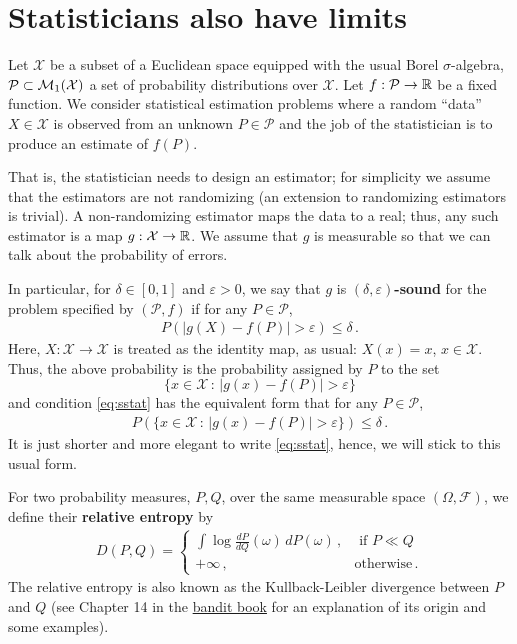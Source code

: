 \documentclass{article}
\newcommand{\cP}{\mathcal{P}}
\newcommand{\cX}{\mathcal{X}}
\DeclareMathOperator*{\1}{\mathbbm{1}}
\newcommand{\cF}{\mathcal{F}}
\newcommand{\0}{\mathbf{0}}
\theoremstyle{definition}
\theoremstyle{remark}
\theoremstyle{theorem}
\begin{document}
\section*{Statisticians also have limits}
Let $\cX$ be a subset of a Euclidean space equipped with the usual Borel $\sigma$-algebra, 
$\cP\subset \cM_1(\cX)$ a set of probability distributions over $\cX$.
Let $f:\cP \to \RR$ be a fixed function.
We consider statistical estimation problems where a random ``data'' $X\in \cX$ is observed
from an unknown $P\in \cP$
and the job of the statistician is to produce an estimate of $f(P)$.

That is, the statistician needs to design an estimator; for simplicity we assume that the estimators are not randomizing (an extension to randomizing estimators is trivial).
A non-randomizing estimator maps the data to a real; thus, any such estimator is a map $g:\cX \to \RR$.
We assume that $g$ is measurable so that we can talk about the probability of errors.

In particular, for $\delta\in [0,1]$ and $\varepsilon>0$, 
we say that $g$ is \textbf{$(\delta,\varepsilon)$-sound} for the problem specified by $(\cP,f)$ if for any $P\in \cP$,
\begin{align}
P( |g(X)-f(P)|>\varepsilon)\le \delta\,.
\label{eq:sstat}
\end{align}
Here, $X:\cX \to \cX$ is treated as the identity map, as usual: $X(x) = x$, $x\in \cX$.
Thus, the above probability is the probability assigned by $P$ to the set 
\[
\{ x\in \cX\,:\, |g(x)-f(P)|>\varepsilon \}
\]
and condition \eqref{eq:sstat} has the equivalent form that for any $P\in \cP$,
\begin{align*}
P(\{ x\in \cX\,:\, |g(x)-f(P)|>\varepsilon \} )\le \delta\,.
\end{align*}
It is just shorter and more elegant to write \cref{eq:sstat}, hence, we will stick to this usual form.

For two probability measures, $P,Q$, over the same measurable space $(\Omega,\cF)$, we define their \textbf{relative entropy} by
\begin{align*}
D(P,Q) =
\begin{cases}
 \int \log \frac{dP}{dQ}(\omega) \, dP(\omega) \,, & \text{ if } P\ll Q\;\\
 +\infty\,, & \text{otherwise}\,.
 \end{cases}
\end{align*}
The relative entropy is also known as the Kullback-Leibler divergence between $P$ and $Q$ (see Chapter 14 in the 
\href{https://tor-lattimore.com/downloads/book/book.pdf}{bandit book} for an explanation of its origin and some examples).
\end{document}
